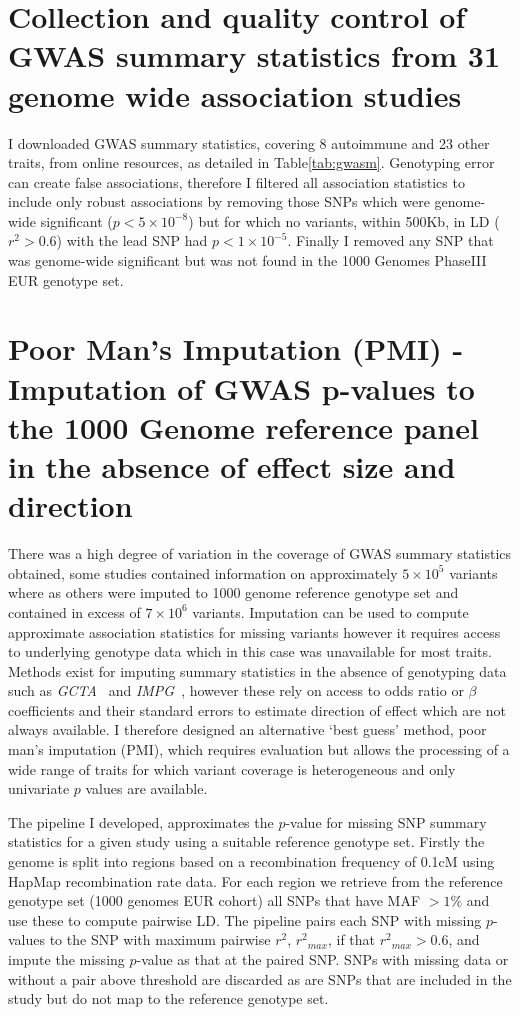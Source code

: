 \documentclass[a4paper,11pt]{report}
\begin{document}
\section{Collection and quality control of GWAS summary statistics from 31 genome wide association studies}
I downloaded GWAS summary statistics, covering 8 autoimmune and 23 other traits, from online resources, as detailed in Table\ref{tab:gwasm}. Genotyping error can create false associations,  therefore I filtered all association statistics to include only robust associations by removing those SNPs which were genome-wide significant ($p < 5 \times 10^{-8}$) but for which no variants, within 500Kb, in LD ($r^{2} > 0.6$) with the lead SNP had $p < 1 \times 10^{-5}$. Finally I removed any SNP that was genome-wide significant but was not found in the 1000 Genomes PhaseIII EUR genotype set. 
\section{Poor Man's Imputation (PMI) - Imputation of GWAS p-values to the 1000 Genome reference panel in the absence of effect size and direction}
There was a high degree of variation in the coverage of GWAS summary statistics obtained, some studies contained information on approximately $5 \times 10^5$ variants where as others were imputed to 1000 genome reference genotype set and contained in excess of $7 \times 10^6$ variants. Imputation can be used to compute approximate association statistics for missing variants however it requires access to underlying genotype data which in this case was unavailable for most traits. Methods exist for imputing summary statistics in the absence of genotyping data such as \textit{GCTA}~\citep{YangLeeGoddardEtAl2011} and \textit{IMPG}~\citep{Pasaniuc2014-im}, however these rely on access to odds ratio or $\beta$ coefficients and their standard errors to estimate direction of effect which are not always available. I therefore designed an alternative `best guess' method, poor man's imputation (PMI), which requires evaluation but allows the processing of a wide range of traits for which variant coverage is heterogeneous and only univariate $p$ values are available.

The pipeline I developed, approximates the $p$-value for missing SNP summary statistics for a given study using a suitable reference genotype set. Firstly the genome is split into regions based on a recombination frequency of 0.1cM using HapMap recombination rate data. For each region we retrieve from the reference genotype set (1000 genomes EUR cohort) all SNPs that have MAF $ > 1\%$ and use these to compute pairwise LD. The pipeline pairs each SNP with missing $p$-values to the SNP with maximum pairwise $r^2$, ${r^2}_{max}$, if that ${r^2}_{max} > 0.6$, and impute the missing $p$-value as that at the paired SNP. SNPs with missing data or without a pair above threshold are discarded as are SNPs that are included in the study but do not map to the reference genotype set.
\end{document}
